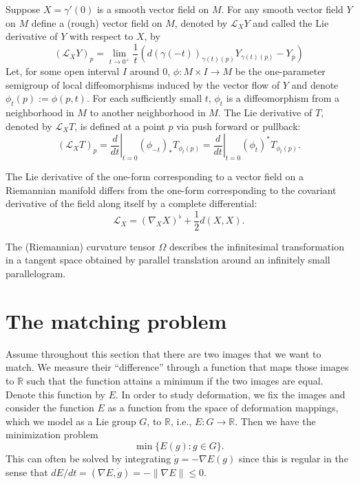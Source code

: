 \documentclass{article}
\theoremstyle{plain}
\theoremstyle{definition}
\newcommand{\R}{\ensuremath{\mathbb{R}}}
\newcommand{\lie}{\ensuremath{\mathcal{L}}}
\begin{document}
Suppose $X=\gamma'(0)$ is a smooth vector field on $M$. %
For any smooth vector field $Y$ on $M$ define a (rough) vector field on $M$, denoted by $\lie_XY$ and called the Lie derivative of $Y$ with respect to $X$, by
\[
(\lie_XY)_p = \lim_{t\to 0^+}\frac{1}{t}\left(d(\gamma(-t))_{\gamma(t)(p)}Y_{\gamma(t)(p)}-Y_p\right)
\]
Let, for some open interval $I$ around $0$, $\phi : M \times I \to M$ be the one-parameter semigroup of local diffeomorphisms induced by the vector flow of $Y$ and denote $\phi_t(p) := \phi(p, t)$. For each sufficiently small $t$, $\phi_t$ is a diffeomorphism from a neighborhood in $M$ to another neighborhood in $M$. The Lie derivative of $T$, denoted by $\lie_XT$, is defined at a point $p$ via push forward or pullback: 
\[
(\lie_XT)_p = \left.\frac{d}{dt}\right|_{t=0} (\phi_{-t})_*T_{\phi_t(p)}=\left.\frac{d}{dt}\right|_{t=0} (\phi_{t})^*T_{\phi_t(p)}.
\]

The Lie derivative of the one-form corresponding to a vector
field on a Riemannian manifold differs from the one-form corresponding to the
covariant derivative of the field along itself by a complete differential:
\[
\lie_X=(\nabla_X X)^\flat +\frac{1}{2}d(X,X).
\]

The (Riemannian) curvature tensor $\Omega$ describes the infinitesimal
transformation in a tangent space obtained by parallel translation around an
infinitely small parallelogram.







\section{The matching problem}
Assume throughout this section that there are two images that we want to match. We measure their ``difference'' through a function that maps those images to $\R$ such that the function attains a minimum if the two images are equal. Denote this function by $E$. In order to study deformation, we fix the images and consider the function $E$ as a function from the space of deformation mappings, which we model as a Lie group $G$, to $\R$, i.e., $E:G\to \R$. Then we have the minimization problem
\[
\min \{E(g):g\in G\}.
\]
This can often be solved by integrating $\dot{g}=-\nabla E(g)$ since this is regular in the sense that $dE/dt=(\nabla E,\dot{g})=-\|\nabla E\|\leq 0$.
\end{document}
